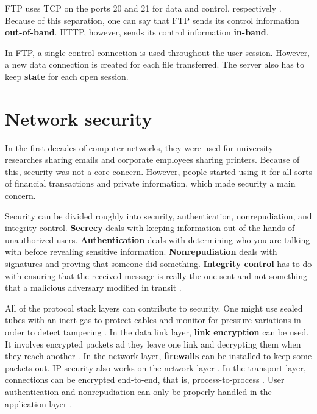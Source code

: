 FTP uses TCP on the ports 20 and 21 for data and control, respectively \cite[p.~117]{computer-networking-kurose-2012}. Because of this separation, one can say that FTP sends its control information \textbf{out-of-band}. HTTP, however, sends its control information \textbf{in-band}.

In FTP, a single control connection is used throughout the user session. However, a new data connection is created for each file transferred. The server also has to keep \textbf{state} for each open session.

\section{Network security}

In the first decades of computer networks, they were used for university researches sharing emails and corporate employees sharing printers. Because of this, security was not a core concern. However, people started using it for all sorts of financial transactions and private information, which made security a main concern.

Security can be divided roughly into security, authentication, nonrepudiation, and integrity control. \textbf{Secrecy} deals with keeping information out of the hands of unauthorized users. \textbf{Authentication} deals with determining who you are talking with before revealing sensitive information. \textbf{Nonrepudiation} deals with signatures and proving that someone did something. \textbf{Integrity control} has to do with ensuring that the received message is really the one sent and not something that a malicious adversary modified in transit \cite[p.~764]{computer-networks-tanenbaum-2012}.

All of the protocol stack layers can contribute to security. One might use sealed tubes with an inert gas to protect cables and monitor for pressure variations in order to detect tampering \cite[p.~765]{computer-networks-tanenbaum-2012}. In the data link layer, \textbf{link encryption} can be used. It involves encrypted packets ad they leave one link and decrypting them when they reach another \cite[p.~765]{computer-networks-tanenbaum-2012}.
In the network layer, \textbf{firewalls} can be installed to keep some packets out. IP security also works on the network layer \cite[p.~765]{computer-networks-tanenbaum-2012}.
In the transport layer, connections can be encrypted end-to-end, that is, process-to-process \cite[p.~765]{computer-networks-tanenbaum-2012}.
User authentication and nonrepudiation can only be properly handled in the application layer \cite[p.~765]{computer-networks-tanenbaum-2012}.

